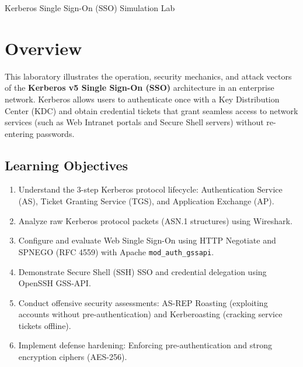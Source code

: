 


\begin{center}
{\LARGE Kerberos Single Sign-On (SSO) Simulation Lab}
\vspace{0.1in}\\
\end{center}

\section{Overview}
This laboratory illustrates the operation, security mechanics, and attack vectors of the 
\textbf{Kerberos v5 Single Sign-On (SSO)} architecture in an enterprise network.
Kerberos allows users to authenticate once with a Key Distribution Center (KDC) and obtain
credential tickets that grant seamless access to network services (such as Web Intranet portals
and Secure Shell servers) without re-entering passwords.

\subsection{Learning Objectives}
\begin{enumerate}
    \item Understand the 3-step Kerberos protocol lifecycle: Authentication Service (AS), Ticket Granting Service (TGS), and Application Exchange (AP).
    \item Analyze raw Kerberos protocol packets (ASN.1 structures) using Wireshark.
    \item Configure and evaluate Web Single Sign-On using HTTP Negotiate and SPNEGO (RFC 4559) with Apache {\tt mod\_auth\_gssapi}.
    \item Demonstrate Secure Shell (SSH) SSO and credential delegation using OpenSSH GSS-API.
    \item Conduct offensive security assessments: AS-REP Roasting (exploiting accounts without pre-authentication) and Kerberoasting (cracking service tickets offline).
    \item Implement defense hardening: Enforcing pre-authentication and strong encryption ciphers (AES-256).
\end{enumerate}


